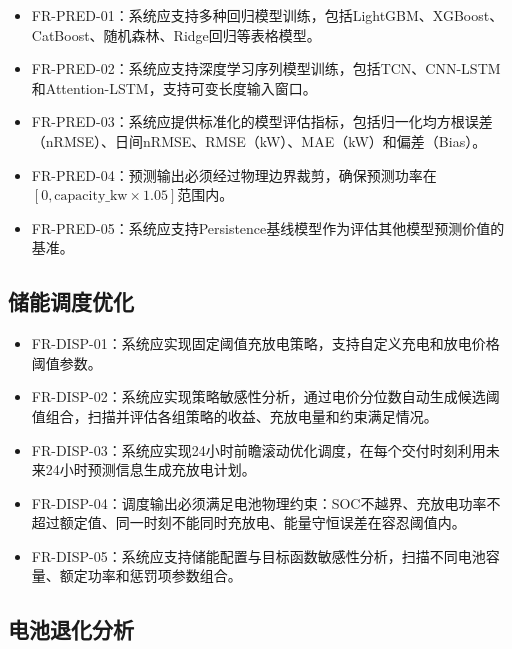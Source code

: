 \documentclass[12pt,a4paper]{ctexbook}
\begin{document}
\begin{itemize}
  \item FR-PRED-01：系统应支持多种回归模型训练，包括LightGBM、XGBoost、CatBoost、随机森林、Ridge回归等表格模型。\cite{lightgbm-2017,xgboost-2016,catboost-2018,random-forest-2001}
  \item FR-PRED-02：系统应支持深度学习序列模型训练，包括TCN、CNN-LSTM和Attention-LSTM，支持可变长度输入窗口。\cite{tcn-wan-2019,wang-cnn-lstm-2019,qu-attention-cnnlstm-2021}
  \item FR-PRED-03：系统应提供标准化的模型评估指标，包括归一化均方根误差（nRMSE）、日间nRMSE、RMSE（kW）、MAE（kW）和偏差（Bias）。
  \item FR-PRED-04：预测输出必须经过物理边界裁剪，确保预测功率在$[0, \text{capacity\_kw} \times 1.05]$范围内。
  \item FR-PRED-05：系统应支持Persistence基线模型作为评估其他模型预测价值的基准。\cite{pv-deep-review-2025}
\end{itemize}

\subsection{储能调度优化}

\begin{itemize}
  \item FR-DISP-01：系统应实现固定阈值充放电策略，支持自定义充电和放电价格阈值参数。\cite{bess-review-2023,milp-dispatch-2021}
  \item FR-DISP-02：系统应实现策略敏感性分析，通过电价分位数自动生成候选阈值组合，扫描并评估各组策略的收益、充放电量和约束满足情况。
  \item FR-DISP-03：系统应实现24小时前瞻滚动优化调度，在每个交付时刻利用未来24小时预测信息生成充放电计划。\cite{bo-two-stage-rolling-2025,li-mpc-microgrid-2025}
  \item FR-DISP-04：调度输出必须满足电池物理约束：SOC不越界、充放电功率不超过额定值、同一时刻不能同时充放电、能量守恒误差在容忍阈值内。\cite{bo-two-stage-rolling-2025,li-mpc-microgrid-2025}
  \item FR-DISP-05：系统应支持储能配置与目标函数敏感性分析，扫描不同电池容量、额定功率和惩罚项参数组合。\cite{bess-review-2023,milp-dispatch-2021}
\end{itemize}

\subsection{电池退化分析}
\end{document}
